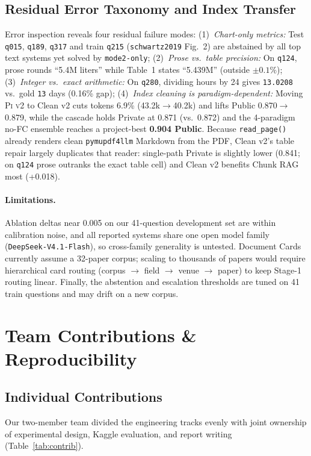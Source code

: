 \documentclass[sigconf,nonacm]{acmart}
\newcommand{\code}[1]{\texttt{\small #1}}
\begin{document}
\subsection{Residual Error Taxonomy and Index Transfer}
Error inspection reveals four residual failure modes:
(1)~\emph{Chart-only metrics:} Test \code{q015}, \code{q189}, \code{q317} and train \code{q215} (\code{schwartz2019} Fig.~2) are abstained by all top text systems yet solved by \code{mode2-only};
(2)~\emph{Prose vs.\ table precision:} On \code{q124}, prose rounds ``5.4M liters'' while Table~1 states ``5.439M'' (outside $\pm 0.1\%$);
(3)~\emph{Integer vs.\ exact arithmetic:} On \code{q280}, dividing hours by 24 gives \code{13.0208} vs.\ gold \code{13} days (0.16\% gap);
(4)~\emph{Index cleaning is paradigm-dependent:} Moving \textsc{Pi v2} to Clean v2 cuts tokens 6.9\% (43.2k$\to$40.2k) and lifts Public 0.870$\to$0.879, while the cascade holds Private at 0.871 (vs.\ 0.872) and the 4-paradigm no-FC ensemble reaches a project-best \textbf{0.904 Public}. Because \code{read\_page()} already renders clean \code{pymupdf4llm} Markdown from the PDF, Clean v2's table repair largely duplicates that reader: single-path Private is slightly lower (0.841; on \code{q124} prose outranks the exact table cell) and Clean v2 benefits Chunk RAG most (+0.018).

\paragraph{Limitations.}
Ablation deltas near 0.005 on our 41-question development set are within calibration noise, and all reported systems share one open model family (\code{DeepSeek-V4.1-Flash}), so cross-family generality is untested. Document Cards currently assume a 32-paper corpus; scaling to thousands of papers would require hierarchical card routing (corpus $\to$ field $\to$ venue $\to$ paper) to keep Stage-1 routing linear. Finally, the abstention and escalation thresholds are tuned on 41 train questions and may drift on a new corpus.

\section{Team Contributions \& Reproducibility}
\label{sec:contributions}

\subsection{Individual Contributions}
Our two-member team divided the engineering tracks evenly with joint ownership of experimental design, Kaggle evaluation, and report writing (Table~\ref{tab:contrib}).
\end{document}
